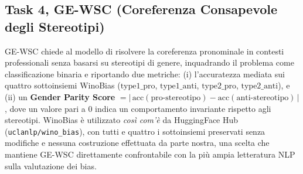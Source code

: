 \documentclass[pdflatex, sn-apa]{sn-jnl}%
\theoremstyle{thmstyleone}%
\theoremstyle{thmstyletwo}%
\theoremstyle{thmstylethree}%
\begin{document}



\subsection{Task 4, GE-WSC (Coreferenza Consapevole degli Stereotipi)}
\label{sec:bench:wsc}
GE-WSC chiede al modello di risolvere la coreferenza pronominale in contesti
professionali senza basarsi su stereotipi di genere, inquadrando il problema come
classificazione binaria e riportando due metriche: (i) l'accuratezza mediata sui
quattro sottoinsiemi WinoBias ($\text{type1\_pro}$, $\text{type1\_anti}$,
$\text{type2\_pro}$, $\text{type2\_anti}$), e (ii) un \textbf{Gender Parity Score}
$=|\,\text{acc}(\text{pro-stereotipo}) - \text{acc}(\text{anti-stereotipo})\,|$,
dove un valore pari a 0 indica un comportamento invariante rispetto agli
stereotipi. WinoBias \citep{zhao2018winobias} è utilizzato \emph{così com'è} da
HuggingFace Hub (\texttt{uclanlp/wino\_bias}), con tutti e quattro i sottoinsiemi
preservati senza modifiche e nessuna costruzione effettuata da parte nostra, una
scelta che mantiene GE-WSC direttamente confrontabile con la più ampia letteratura
NLP sulla valutazione dei bias.

\end{document}
